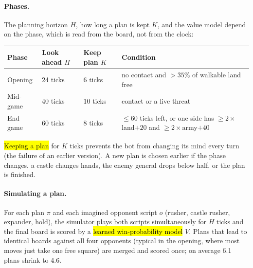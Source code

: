 \paragraph{Phases.} The planning horizon $H$, how long a plan is kept $K$, and the value model depend on the
phase, which is read from the board, not from the clock:
\begin{center}
\small
\begin{tabularx}{\linewidth}{lllX}
\toprule
\textbf{Phase} & \textbf{Look ahead $H$} & \textbf{Keep plan $K$} & \textbf{Condition}\\
\midrule
Opening & 24 ticks & 6 ticks & no contact and $>35\%$ of walkable land free\\
Mid-game & 40 ticks & 10 ticks & contact or a live threat\\
End game & 60 ticks & 8 ticks & $\le 60$ ticks left, or one side has $\ge 2\times$land$+20$ and $\ge 2\times$army$+40$\\
\bottomrule
\end{tabularx}
\end{center}
\hl{Keeping a plan} for $K$ ticks prevents the bot from changing its mind every turn (the failure of an earlier
version). A new plan is chosen earlier if the phase changes, a castle changes hands, the enemy general drops
below half, or the plan is finished.

\paragraph{Simulating a plan.} For each plan $\pi$ and each imagined opponent script $o$ (rusher, castle
rusher, expander, hold), the simulator plays both scripts simultaneously for $H$ ticks and the final board is
scored by a \hl{learned win-probability model} $V$. Plans that lead to identical boards against all four
opponents (typical in the opening, where most moves just take one free square) are merged and scored once; on
average 6.1 plans shrink to 4.6.

